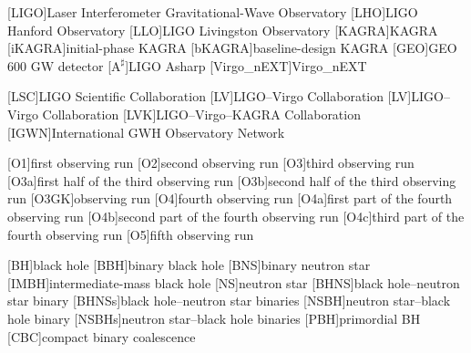 
\usepackage{amstext}
\makeatletter
{}
\makeatother

\protected\def\protectedacused{\acused}

[LIGO]{Laser Interferometer Gravitational-Wave Observatory}
[LHO]{\ac{LIGO} Hanford Observatory}
[LLO]{\ac{LIGO} Livingston Observatory}
[KAGRA]{KAGRA}
[iKAGRA]{initial-phase \ac{KAGRA}}
[bKAGRA]{baseline-design \ac{KAGRA}}
[GEO]{GEO\,600 \ac{GW} detector}
[\ensuremath{\text{A}^\sharp}]{\ac{LIGO} \acs{Asharp}}
[Virgo\_nEXT]{Virgo\_nEXT}

[LSC]{\acs{LIGO} Scientific Collaboration}
[LV]{\acs{LIGO}--\acs{Virgo} Collaboration\protect{}}
[LV]{\acs{LIGO}--\acs{Virgo} Collaboration\protect{}}
[LVK]{\acs{LIGO}--\ac{Virgo}--\ac{KAGRA} Collaboration}
[IGWN]{International \ac{GWH} Observatory Network}

[O1]{first observing run}
[O2]{second observing run}
[O3]{third observing run}
[O3a]{first half of the third observing run}
[O3b]{second half of the third observing run}
[O3GK]{observing run}
[O4]{fourth observing run}
[O4a]{first part of the fourth observing run}
[O4b]{second part of the fourth observing run}
[O4c]{third part of the fourth observing run}
[O5]{fifth observing run}

[BH]{black hole}
[BBH]{binary black hole}
[BNS]{binary neutron star}
[IMBH]{intermediate-mass black hole}
[NS]{neutron star}
[BHNS]{black hole--neutron star binary}
[BHNSs]{black hole--neutron star binaries}
[NSBH]{neutron star--black hole binary}
[NSBHs]{neutron star--black hole binaries}
[PBH]{primordial \ac{BH}}
[CBC]{compact binary coalescence}

